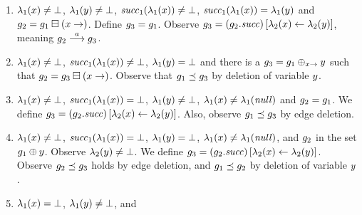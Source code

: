 \begin{enumerate}
\begin{enumerate}
\item
\label{nextassignment:defined:defined:defined}
$\lambda_1(x)\neq\bot$,
$\lambda_1(y)\neq\bot$,
${\it succ}_1(\lambda_1(x))\neq\bot$,
${\it succ}_1(\lambda_1(x))=\lambda_1(y)$ and
$g_2=g_1\boxminus({x}\rightarrow)$.
%
Define $g_3=g_1$. %
%
Observe $g_3=\left(g_2.{\it succ}\right)
\left[\lambda_2(x)\leftarrow\lambda_2(y)\right]$,
meaning $g_2\stackrel{a}{\longrightarrow}g_3$.
%
\item
$\lambda_1(x)\neq\bot$,
${\it succ}_1(\lambda_1(x))\neq\bot$,
$\lambda_1(y)=\bot$ and there is a 
$g_3=g_1\oplus_{{x}\rightarrow}{y}$
such that
$g_2=g_3\boxminus({x}\rightarrow)$.
%
%
%
Observe that $g_1\preceq g_3$ by deletion
of variable $y$.
%
\item
$\lambda_1(x)\neq\bot$,
${\it succ}_1(\lambda_1(x))=\bot$,
$\lambda_1(y)\neq\bot$, 
$\lambda_1(x)\neq\lambda_1({\it null})$ 
and
$g_2=g_1$.
%
We define $g_3=\left(g_2.{\it succ}\right)
\left[\lambda_2(x)\leftarrow\lambda_2(y)\right]$.
%
%
Also, observe 
$g_1\preceq g_3$ by edge deletion.
\item
$\lambda_1(x)\neq\bot$,
${\it succ}_1(\lambda_1(x))=\bot$,
$\lambda_1(y)=\bot$, 
$\lambda_1(x)\neq\lambda_1({\it null})$, and
$g_2$ in the set $g_1\oplus{\ensuremath{y}}$.
%
Observe $\lambda_2(y)\neq\bot$.
%
%
We define $g_3=\left(g_2.{\it succ}\right)
\left[\lambda_2(x)\leftarrow\lambda_2(y)\right]$.
%
%
Observe $g_2\preceq g_3$ holds by edge deletion,
%
and $g_1\preceq g_2$
by deletion of variable $y$.
\item
\label{nextassignment:undefined:undefined}
$\lambda_1(x)=\bot$,
$\lambda_1(y)\neq\bot$, and

\end{enumerate}
\end{enumerate}
